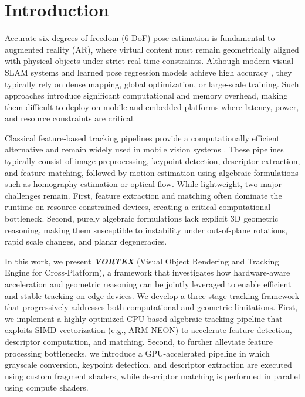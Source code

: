 \section{Introduction}

Accurate six degrees-of-freedom (6-DoF) pose estimation is fundamental to augmented reality (AR), where virtual content must remain geometrically aligned with physical objects under strict real-time constraints. Although modern visual SLAM systems and learned pose regression models achieve high accuracy \cite{murartal2015orbslam, engel2014lsdslam, newcombe2011kinectfusion, klein2007ptam}, they typically rely on dense mapping, global optimization, or large-scale training. Such approaches introduce significant computational and memory overhead, making them difficult to deploy on mobile and embedded platforms where latency, power, and resource constraints are critical.

Classical feature-based tracking pipelines provide a computationally efficient alternative and remain widely used in mobile vision systems \cite{miu2020cvmp, rambach2018}. These pipelines typically consist of image preprocessing, keypoint detection, descriptor extraction, and feature matching, followed by motion estimation using algebraic formulations such as homography estimation or optical flow. While lightweight, two major challenges remain. First, feature extraction and matching often dominate the runtime on resource-constrained devices, creating a critical computational bottleneck. Second, purely algebraic formulations lack explicit 3D geometric reasoning, making them susceptible to instability under out-of-plane rotations, rapid scale changes, and planar degeneracies.

In this work, we present \textbf{\textit{VORTEX}} (Visual Object Rendering and Tracking Engine for Cross-Platform), a framework that investigates how hardware-aware acceleration and geometric reasoning can be jointly leveraged to enable efficient and stable tracking on edge devices. We develop a three-stage tracking framework that progressively addresses both computational and geometric limitations. First, we implement a highly optimized CPU-based algebraic tracking pipeline that exploits SIMD vectorization (e.g., ARM NEON) to accelerate feature detection, descriptor computation, and matching. Second, to further alleviate feature processing bottlenecks, we introduce a GPU-accelerated pipeline in which grayscale conversion, keypoint detection, and descriptor extraction are executed using custom fragment shaders, while descriptor matching is performed in parallel using compute shaders.

